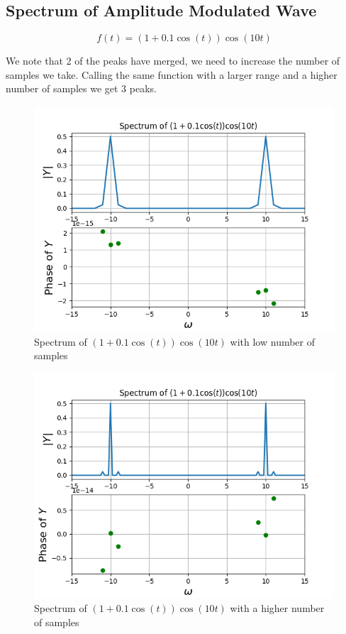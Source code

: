 \documentclass{article}
\begin{document}
\clearpage
\subsection{Spectrum of Amplitude Modulated Wave}

\begin{equation}
f(t) = (1+0.1\cos(t))\cos(10t)    
\end{equation}

We note that 2 of the peaks have merged, we need to increase the number of samples we take. Calling the same function with a larger range and a higher number of samples we get 3 peaks.

\begin{figure}[h!]
\centering
\includegraphics[scale=0.55]{fig9-3.png}
\caption{Spectrum of $(1+0.1\cos(t))\cos(10t)$ with low number of samples}
\label{fig:universe}
\end{figure}

\begin{figure}[h!]
\centering
\includegraphics[scale=0.55]{fig9-4.png}
\caption{Spectrum of $(1+0.1\cos(t))\cos(10t)$ with a higher number of samples}
\label{fig:universe}
\end{figure}
\clearpage
\end{document}
